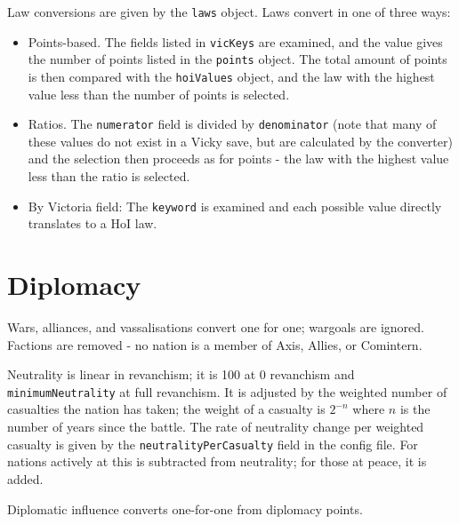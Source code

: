 \documentclass[12pt,ebook,oneside]{book}
\begin{document}
Law conversions are given by the \texttt{laws} object.
Laws convert in one of three ways:
\begin{itemize}
\item Points-based. The fields listed in \texttt{vicKeys} are
  examined, and the value gives the number of points listed in the
  \texttt{points} object. The total amount of points is then compared
  with the \texttt{hoiValues} object, and the law with the highest
  value less than the number of points is selected. 
\item Ratios. The \texttt{numerator} field is divided by
  \texttt{denominator} (note that many of these values do not exist in
  a Vicky save, but are calculated by the converter) and the selection
  then proceeds as for points - the law with the highest value less
  than the ratio is selected. 
\item By Victoria field: The \texttt{keyword} is examined and each
  possible value directly translates to a HoI law. 
\end{itemize}

\section{Diplomacy}

Wars, alliances, and vassalisations convert one for one; wargoals are
ignored. Factions are removed - no nation is a member of Axis, Allies, or
Comintern. 

Neutrality is linear in revanchism; it is 100 at 0 revanchism and
\texttt{minimumNeutrality} at full revanchism. It is adjusted by the
weighted number of casualties the nation has taken; the weight of a
casualty is $2^{-n}$ where $n$ is the number of years since the
battle. The rate of neutrality change per weighted casualty is given by
the \texttt{neutralityPerCasualty} field in the config file. For
nations actively at this is subtracted from neutrality; for those at
peace, it is added. 

Diplomatic influence converts one-for-one from diplomacy points. 
\end{document}
